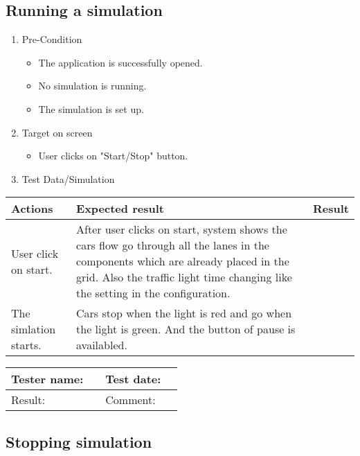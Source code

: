 \newpage 

\subsection{Running a simulation}

\begin{enumerate}
	\item Pre-Condition
	\begin{itemize}
		\item The application is successfully opened.
		\item No simulation is running.
		\item The simulation is set up.
	\end{itemize}
	\item Target on screen
	\begin{itemize}
		\item User clicks on "Start/Stop" button.
	\end{itemize}
	\item Test Data/Simulation
\end{enumerate}	
	\begin{tabularx}{\textwidth}{|X|X|p{2.5cm}|}\hline
		Actions & Expected result & Result \\\hline
		User click on start. & After user clicks on start, system shows the cars flow go through all the lanes in the components which are already placed in the grid. Also the traffic light time changing like the setting in the configuration. & \pass \\\hline
		The simlation starts. &	Cars stop when the light is red and go when the light is green. And the button of pause is availabled. & \pass \\\hline	
	\end{tabularx}


\begin{tabularx}{\textwidth}{|p{3cm}X|p{3cm}X|}\hline
	Tester name: &  & Test date: & \\\hline
	Result: &   \pass & Comment: & \\\hline
\end{tabularx}

\newpage

\subsection{Stopping  simulation}

